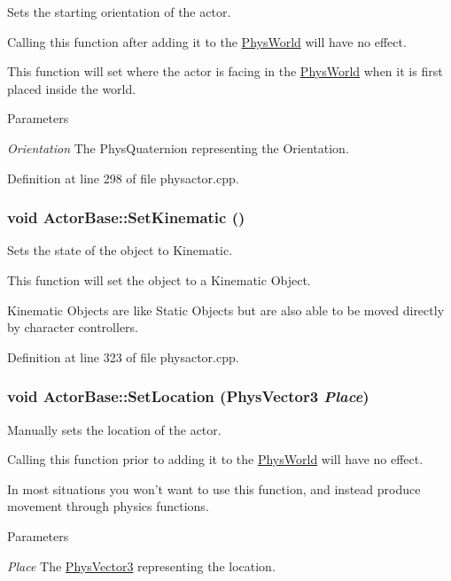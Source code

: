 Sets the starting orientation of the actor. 

Calling this function after adding it to the \hyperlink{classPhysWorld}{PhysWorld} will have no effect. \par
 This function will set where the actor is facing in the \hyperlink{classPhysWorld}{PhysWorld} when it is first placed inside the world. 
\begin{DoxyParams}{Parameters}
\item[{\em Orientation}]The PhysQuaternion representing the Orientation. \end{DoxyParams}


Definition at line 298 of file physactor.cpp.

\hypertarget{classActorBase_a2d5f990e8c6925b7e44e9ec85f379e6a}{
\subsubsection[{SetKinematic}]{\setlength{\rightskip}{0pt plus 5cm}void ActorBase::SetKinematic ()}}
\label{dd/d7b/classActorBase_a2d5f990e8c6925b7e44e9ec85f379e6a}


Sets the state of the object to Kinematic. 

This function will set the object to a Kinematic Object. \par
 Kinematic Objects are like Static Objects but are also able to be moved directly by character controllers. 

Definition at line 323 of file physactor.cpp.

\hypertarget{classActorBase_a2a204add0b036de441ebd59d14939000}{
\subsubsection[{SetLocation}]{\setlength{\rightskip}{0pt plus 5cm}void ActorBase::SetLocation ({\bf PhysVector3} {\em Place})}}
\label{dd/d7b/classActorBase_a2a204add0b036de441ebd59d14939000}


Manually sets the location of the actor. 

Calling this function prior to adding it to the \hyperlink{classPhysWorld}{PhysWorld} will have no effect. \par
 In most situations you won't want to use this function, and instead produce movement through physics functions. 
\begin{DoxyParams}{Parameters}
\item[{\em Place}]The \hyperlink{classPhysVector3}{PhysVector3} representing the location. \end{DoxyParams}


